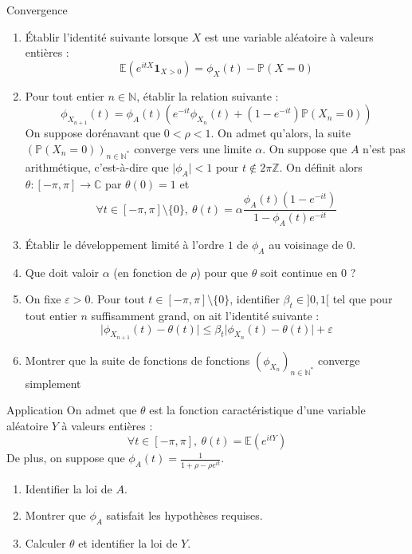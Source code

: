 \documentclass[french,a4paper]{article}
\renewcommand{\P}{\mathbb{P}}
\newcommand{\N}{\mathbb{N}}
\newcommand{\Z}{\mathbb{Z}}
\newcommand{\C}{\mathbb{C}}
\newcommand{\st}{^*}
\newcommand{\E}{\mathbb{E}}
\theoremstyle{plain}
\theoremstyle{definition}
\theoremstyle{remark}
\begin{document}
\begin{ex}[Châteaux]{Convergence}
	\begin{enumerate}
		\item Établir l'identité suivante lorsque $X$ est une variable aléatoire à valeurs entières : $$\E(e^{itX}\mathbf{1}_{X>0})=\phi_X(t)-\P(X=0)$$
		\item Pour tout entier $n\in\N$, établir la relation suivante : $$\phi_{X_{n+1}}(t)=\phi_A(t)\left(e^{-it}\phi_{X_n}(t)+(1-e^{-it})\P(X_n=0)\right)$$ On suppose dorénavant que $0<\rho<1$. On admet qu'alors, la suite $(\P(X_n=0))_{n\in\N\st}$ converge vers une limite $\alpha$. On suppose que $A$ n'est pas arithmétique, c'est-à-dire que $\lvert\phi_A\rvert<1$ pour $t\notin2\pi\Z$. On définit alors $\theta:[-\pi,\pi]\to\C$ par $\theta(0)=1$ et $$\forall t\in[-\pi,\pi]\setminus\{0\},\ \theta(t)=\alpha\frac{\phi_A(t)(1-e^{-it})}{1-\phi_A(t)e^{-it}}$$
		\item Établir le développement limité à l'ordre $1$ de $\phi_A$ au voisinage de $0$.
		\item Que doit valoir $\alpha$ (en fonction de $\rho$) pour que $\theta$ soit continue en $0$ ?
		\item On fixe $\varepsilon>0$. Pour tout $t\in[-\pi,\pi]\setminus\{0\}$, identifier $\beta_t\in]0,1[$ tel que pour tout entier $n$ suffisamment grand, on ait l'identité suivante : $$\lvert\phi_{X_{n+1}}(t)-\theta(t)\rvert\leqslant\beta_t\lvert\phi_{X_n}(t)-\theta(t)\rvert+\varepsilon$$
		\item Montrer que la suite de fonctions de fonctions $(\phi_{X_n})_{n\in\N\st}$ converge simplement
	\end{enumerate}
\end{ex}

\begin{ex}[Châteaux]{Application}
	On admet que $\theta$ est la fonction caractéristique d'une variable aléatoire $Y$ à valeurs entières : $$\forall t\in[-\pi,\pi],\ \theta(t)=\E(e^{itY})$$ De plus, on suppose que $\displaystyle\phi_A(t)=\frac{1}{1+\rho-\rho e^{it}}$.
	\begin{enumerate}
		\item Identifier la loi de $A$.
		\item Montrer que $\phi_A$ satisfait les hypothèses requises.
		\item Calculer $\theta$ et identifier la loi de $Y$.
	\end{enumerate}
\end{ex}
\end{document}

